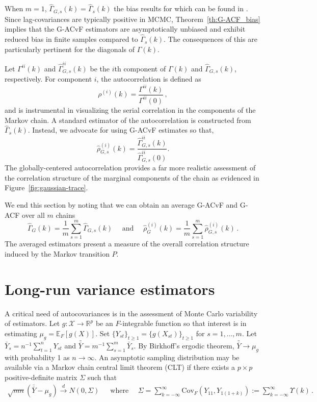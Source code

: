 \documentclass[12pt]{article}
\newcommand{\Cov}{\text{Cov}}
\newcommand{\X}{\mathcal{X}}
\theoremstyle{remark}
\begin{document}
When $m = 1$, $\hat{\Gamma}_{G,s}(k) = \hat{\Gamma}_{s}(k)
$ the bias results for which can be found in \cite{priestley1981spectral}. Since lag-covariances are typically positive in MCMC, Theorem~\ref{th:G-ACF_bias} implies that the G-ACvF estimators are asymptotically unbiased and exhibit reduced bias in finite samples compared to $\hat{\Gamma}_s(k)$. The consequences of this are particularly pertinent for the diagonals of $\Gamma(k)$.

Let $\Gamma^{ii}(k)$ and $\hat{\Gamma}_{G,s}^{ii}(k)$ be the $i${th} component of $\Gamma(k)$ and $\hat{\Gamma}_{G,s}(k)$, respectively. For component $i$, the autocorrelation is defined as
\[
\rho^{(i)}(k) = \dfrac{\Gamma^{ii}(k)}{\Gamma^{ii}(0)}\,,
\]
and is instrumental in visualizing the serial correlation in the components of the Markov chain. A standard estimator of the autocorrelation is constructed from $\hat{\Gamma}_s(k)$. Instead, we advocate for using G-ACvF estimates so that,
\begin{equation}
\label{eq:acf}
 \hat{\rho}_{G,s}^{(i)}(k) = \dfrac{ \hat{\Gamma}^{ii}_{G,s} (k)}{\hat{\Gamma}^{ii}_{G,s} (0)}. 
\end{equation}
The globally-centered autocorrelation provides a far more realistic assessment of the correlation structure of the marginal components of the chain  as evidenced in Figure~\ref{fig:gaussian-trace}.

We end this section by noting that we can obtain an average G-ACvF and G-ACF over all $m$ chains
\[
\hat{\Gamma}_G(k) = \dfrac{1}{m}\sum_{s=1}^m \hat{\Gamma}_{G,s}(k) \quad \text{ and } \quad \hat{\rho}^{(i)}_G(k) = \dfrac{1}{m}\sum_{s=1}^m \hat{\rho}^{(i)}_{G,s}(k)\,.
\]
The averaged estimators present a measure of the overall correlation structure induced by the Markov transition $P$. 

\section{Long-run variance estimators} \label{sec:variance_est}

A critical need of autocovariances is in the assessment of Monte Carlo variability of estimators.  Let $g:\X \to \mathbb{R}^p$ be an $F$-integrable function so that interest is in estimating
$\mu_g = \mathbb{E}_F[g(X)]$.
Set $\{Y_{st}\}_{t \geq 1} = \{g(X_{st})\}_{t \geq 1}$ for $s = 1, \dots, m$. Let $\bar{Y}_s = n^{-1}\sum_{t=1}^{n}Y_{st}$  and  $\bar{\bar{Y}} = m^{-1}\sum_{s=1}^{m}\bar{Y}_s$. By Birkhoff's ergodic theorem,  $\bar{\bar{Y}} \to \mu_g$ with probability 1 as $n \to \infty$. An asymptotic sampling distribution may be available via a Markov chain central limit theorem (CLT) if there exists a $p \times p$ positive-definite matrix $\Sigma$ such that
%
\begin{align*}
  \sqrt{mn}(\bar{\bar{Y}} - \mu_g) \xrightarrow{d} N(0,\Sigma)\, \quad \text{ where }  \quad 
  \Sigma = \sum_{k = -\infty}^{\infty} \Cov_F \left( Y_{11}, Y_{1(1+k)} \right) := \sum_{k = -\infty}^{\infty}\Upsilon (k)\,.
\end{align*}
\end{document}
